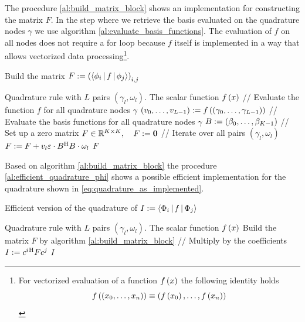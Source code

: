 The procedure \ref{al:build_matrix_block} shows an implementation for constructing the matrix $F$.
In the step where we retrieve the basis evaluated on the quadrature nodes $\gamma$
we use algorithm \ref{al:evaluate_basis_functions}. The evaluation of $f$ on all nodes
does not require a for loop because $f$ itself is implemented in a way that allows
vectorized data processing\footnote{
For vectorized evaluation of a function $f\left( x \right)$ the following identity holds
\begin{equation}
  f\left( \left(x_0, \ldots, x_{n}\right) \right) \equiv \left(f\left( x_0 \right), \ldots, f\left( x_{n} \right)\right)
\end{equation}}.

\begin{algorithm}
\caption{Build the matrix $F := \left(\Braket{\phi_i|f|\phi_j}\right)_{i,j}$}
\label{al:build_matrix_block}
\begin{algorithmic}
  \REQUIRE Quadrature rule with $L$ pairs $\left(\gamma_l, \omega_l\right)$.
  \REQUIRE The scalar function $f\left( x \right)$
  \STATE // Evaluate the function $f$ for all quadrature nodes $\gamma$
  \STATE $\left(v_0, \ldots, v_{L-1}\right) := f\left( \left(\gamma_0, \ldots, \gamma_{L-1}\right) \right)$
  \STATE // Evaluate the basis functions for all quadrature nodes $\gamma$
  \STATE $B := \left(\beta_0, \ldots, \beta_{K-1}\right)$
  \STATE // Set up a zero matrix
  \STATE $F \in \mathbb{R}^{K \times K}, \quad F := \mathbf{0}$
  \STATE // Iterate over all pairs $\left(\gamma_l, \omega_l\right)$
    \STATE $F := F + v_{l} \varepsilon \cdot B{}^{\textnormal{H}} B \cdot \omega_l$
  \ENDFOR
  \RETURN $F$
\end{algorithmic}
\end{algorithm}

Based on algorithm \ref{al:build_matrix_block} the procedure \ref{al:efficient_quadrature_phi}
shows a possible efficient implementation for the quadrature shown in \eqref{eq:quadrature_as_implemented}.

\begin{algorithm}
\caption{Efficient version of the quadrature of $I := \Braket{\Phi_i|f|\Phi_j}$}
\label{al:efficient_quadrature_phi}
\begin{algorithmic}
  \REQUIRE Quadrature rule with $L$ pairs $\left(\gamma_l, \omega_l\right)$.
  \REQUIRE The scalar function $f\left( x \right)$
  \STATE Build the matrix $F$ by algorithm \ref{al:build_matrix_block}
  \STATE // Multiply by the coefficients
  \STATE $I := c^i{}^{\textnormal{H}} F c^j$
  \RETURN $I$
\end{algorithmic}
\end{algorithm}

